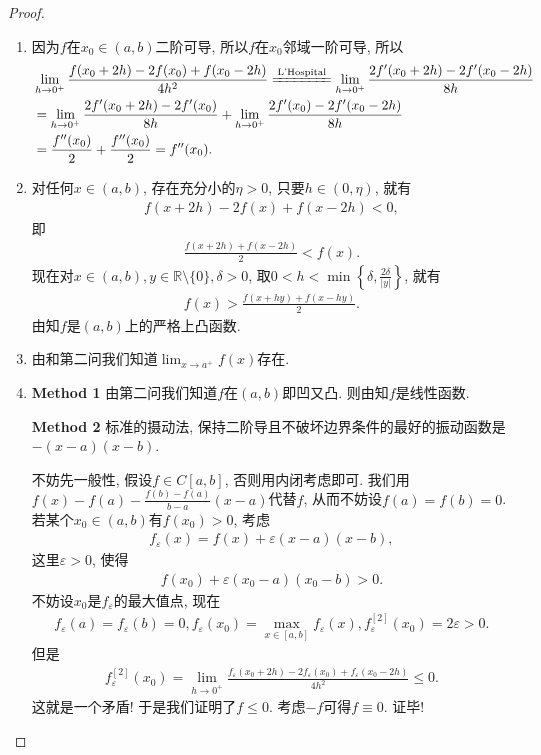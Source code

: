 \documentclass[../../main.tex]{subfiles}
\begin{document}
\begin{proof}
\begin{enumerate}
\item 因为$f$在$x_0 \in (a,b)$二阶可导, 所以$f$在$x_0$邻域一阶可导, 所以
\begin{align*}
&\lim_{h \to 0^+} \frac{f(x_0 + 2h) - 2f(x_0) + f(x_0 - 2h)}{4h^2} \xlongequal{\text{L'Hospital}} \lim_{h \to 0^+} \frac{2f'(x_0 + 2h) - 2f'(x_0 - 2h)}{8h} \\
&= \lim_{h \to 0^+} \frac{2f'(x_0 + 2h) - 2f'(x_0)}{8h} + \lim_{h \to 0^+} \frac{2f'(x_0) - 2f'(x_0 - 2h)}{8h} \\
&= \frac{f''(x_0)}{2} + \frac{f''(x_0)}{2} = f''(x_0).
\end{align*}

\item 对任何$x \in (a,b)$, 存在充分小的$\eta > 0$, 只要$h \in (0,\eta)$, 就有
\begin{align*}
f(x + 2h) - 2f(x) + f(x - 2h) < 0,
\end{align*}
即
\begin{align*}
\frac{f(x + 2h) + f(x - 2h)}{2} < f(x).
\end{align*}
现在对$x \in (a,b), y \in \mathbb{R} \setminus \{0\}, \delta > 0$, 取$0 < h < \min\left\{\delta, \frac{2\delta}{|y|}\right\}$, 就有
\begin{align*}
f(x) > \frac{f(x + hy) + f(x - hy)}{2}.
\end{align*}
由知$f$是$(a,b)$上的严格上凸函数.

\item  由和第二问我们知道$\lim_{x \to a^+} f(x)$存在.

\item  \textbf{Method 1} 由第二问我们知道$f$在$(a,b)$即凹又凸. 则由知$f$是线性函数.

\textbf{Method 2} 标准的摄动法, 保持二阶导且不破坏边界条件的最好的振动函数是$-(x - a)(x - b)$.

不妨先一般性, 假设$f \in C[a,b]$, 否则用内闭考虑即可. 
我们用$f(x) - f(a) - \frac{f(b) - f(a)}{b - a}(x - a)$代替$f$, 从而不妨设$f(a) = f(b) = 0$. 若某个$x_0 \in (a,b)$有$f(x_0) > 0$, 考虑
\begin{align*}
f_\varepsilon(x) = f(x) + \varepsilon(x - a)(x - b),
\end{align*}
这里$\varepsilon > 0$, 使得
\begin{align*}
f(x_0) + \varepsilon(x_0 - a)(x_0 - b) > 0.
\end{align*}
不妨设$x_0$是$f_\varepsilon$的最大值点, 现在
\begin{align*}
f_\varepsilon(a) = f_\varepsilon(b) = 0, f_\varepsilon(x_0) = \max_{x \in [a,b]} f_\varepsilon(x), f_\varepsilon^{[2]}(x_0) = 2\varepsilon > 0.
\end{align*}
但是
\begin{align*}
f_\varepsilon^{[2]}(x_0) = \lim_{h \to 0^+} \frac{f_\varepsilon(x_0 + 2h) - 2f_\varepsilon(x_0) + f_\varepsilon(x_0 - 2h)}{4h^2} \leqslant 0.
\end{align*}
这就是一个矛盾! 于是我们证明了$f \leqslant 0$. 考虑$-f$可得$f \equiv 0$. 证毕!
\end{enumerate}

\end{proof}
\end{document}
